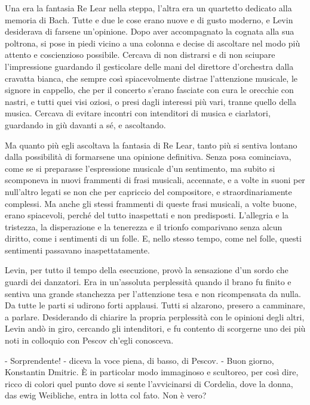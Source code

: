 Una era la fantasia Re Lear nella steppa, l'altra era un quartetto dedicato alla memoria di Bach. Tutte e due le cose erano nuove e di gusto moderno, e Levin desiderava di farsene un'opinione. Dopo aver accompagnato la cognata alla sua poltrona, si pose in piedi vicino a una colonna e decise di ascoltare nel modo più attento e coscienzioso possibile. Cercava di non distrarsi e di non sciupare l'impressione guardando il gesticolare delle mani del direttore d'orchestra dalla cravatta bianca, che sempre così spiacevolmente distrae l'attenzione musicale, le signore in cappello, che per il concerto s'erano fasciate con cura le orecchie con nastri, e tutti quei visi oziosi, o presi dagli interessi più vari, tranne quello della musica. Cercava di evitare incontri con intenditori di musica e ciarlatori, guardando in giù davanti a sé, e ascoltando. 

Ma quanto più egli ascoltava la fantasia di Re Lear, tanto più si sentiva lontano dalla possibilità di formarsene una opinione definitiva. Senza posa cominciava, come se si preparasse l'espressione musicale d'un sentimento, ma subito si scomponeva in nuovi frammenti di frasi musicali, accennate, e a volte in suoni per null'altro legati se non che per capriccio del compositore, e straordinariamente complessi. Ma anche gli stessi frammenti di queste frasi musicali, a volte buone, erano spiacevoli, perché del tutto inaspettati e non predisposti. L'allegria e la tristezza, la disperazione e la tenerezza e il trionfo comparivano senza alcun diritto, come i sentimenti di un folle. E, nello stesso tempo, come nel folle, questi sentimenti passavano inaspettatamente. 

Levin, per tutto il tempo della esecuzione, provò la sensazione d'un sordo che guardi dei danzatori. Era in un'assoluta perplessità quando il brano fu finito e sentiva una grande stanchezza per l'attenzione tesa e non ricompensata da nulla. Da tutte le parti si udirono forti applausi. Tutti si alzarono, presero a camminare, a parlare. Desiderando di chiarire la propria perplessità con le opinioni degli altri, Levin andò in giro, cercando gli intenditori, e fu contento di scorgerne uno dei più noti in colloquio con Pescov ch'egli conosceva. 

- Sorprendente! - diceva la voce piena, di basso, di Pescov. - Buon giorno, Konstantin Dmitric. È in particolar modo immaginoso e scultoreo, per così dire, ricco di colori quel punto dove si sente l'avvicinarsi di Cordelia, dove la donna, das ewig Weibliche, entra in lotta col fato. Non è vero? 

